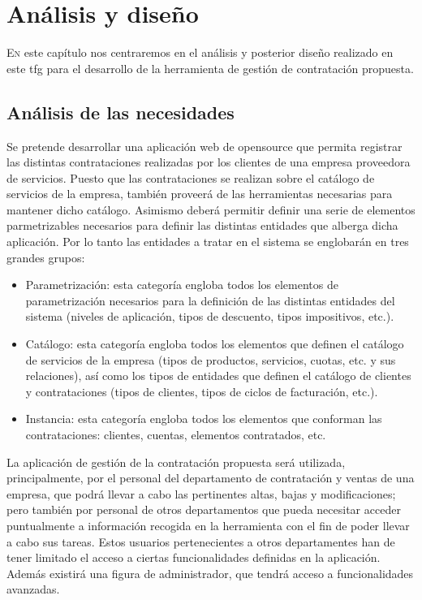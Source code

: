 \chapter{Análisis y diseño}
\label{chap:analisis-diseño}


\lettrine{E}{n} este capítulo nos centraremos en el análisis y posterior diseño realizado en este \acrshort{tfg} para el desarrollo de la herramienta de gestión de contratación propuesta.

\section{Análisis de las necesidades}
\label{sec:analisis}
Se pretende desarrollar una aplicación web de \gls{opensource} que permita registrar las distintas contrataciones realizadas por los clientes de una empresa proveedora de servicios. Puesto que las contrataciones se realizan sobre el catálogo de servicios de la empresa, también proveerá de las herramientas necesarias para mantener dicho catálogo. Asimismo deberá permitir definir una serie de elementos parmetrizables necesarios para definir las distintas entidades que alberga dicha aplicación. Por lo tanto las entidades a tratar en el sistema se englobarán en tres grandes grupos:
\begin{itemize}
\item Parametrización: esta categoría engloba todos los elementos de parametrización necesarios para la definición de las distintas entidades del sistema (niveles de aplicación, tipos de descuento, tipos impositivos, etc.).
\item Catálogo: esta categoría engloba todos los elementos que definen el catálogo de servicios de la empresa (tipos de productos, servicios, cuotas, etc. y sus relaciones), así como los tipos de entidades que definen el catálogo de clientes y contrataciones (tipos de clientes, tipos de ciclos de facturación, etc.).
\item Instancia: esta categoría engloba todos los elementos que conforman las contrataciones: clientes, cuentas, elementos contratados, etc.
\end{itemize}


La aplicación de gestión de la contratación propuesta será utilizada, principalmente, por el personal del departamento de contratación y ventas de una empresa, que podrá llevar a cabo las pertinentes altas, bajas y modificaciones; pero también por personal de otros departamentos que pueda necesitar acceder puntualmente a información recogida en la herramienta con el fin de poder llevar a cabo sus tareas. Estos usuarios pertenecientes a otros departamentes han de tener limitado el acceso a ciertas funcionalidades definidas en la aplicación. Además existirá una figura de administrador, que tendrá acceso a funcionalidades avanzadas.



